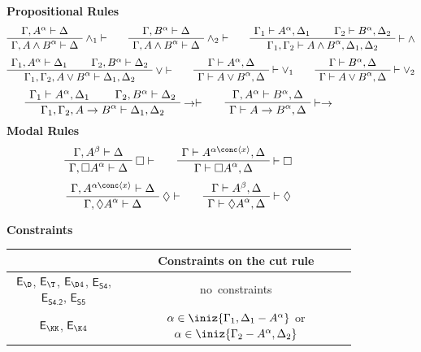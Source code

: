 \documentclass{article}
\newcommand{\seq}[2]{{#1} \vdash{} {#2}}
\newcommand{\pf}[2]{{#1}^{#2}} %
\theoremstyle{definition}
\begin{document}
{\begin{figure}
\textbf{Propositional Rules}
\[
\AxiomC{$\seq{\Gamma, \pf{A}{\alpha}}{\Delta}$}
\RightLabel{$\wedge_1 \vdash$}
\UnaryInfC{$\seq{\Gamma, \pf{A \wedge B}{\alpha}}{\Delta}$}
\DisplayProof
\qquad
\AxiomC{$\seq{\Gamma, \pf{B}{\alpha}}{\Delta}$}
\RightLabel{$\wedge_2 \vdash$}
\UnaryInfC{$\seq{\Gamma, \pf{A \wedge B}{\alpha}}{\Delta}$}
\DisplayProof
\qquad
\AxiomC{$\seq{\Gamma_1}{\pf{A}{\alpha}, \Delta_1}$}
\AxiomC{$\seq{\Gamma_2}{\pf{B}{\alpha}, \Delta_2}$}
\RightLabel{$\vdash \wedge$}
\BinaryInfC{$\seq{\Gamma_1, \Gamma_2}{\pf{A \wedge B}{\alpha}, \Delta_1, \Delta_2}$}
\DisplayProof
\]
\[
\AxiomC{$\seq{\Gamma_1, \pf{A}{\alpha}}{\Delta_1}$}
\AxiomC{$\seq{\Gamma_2, \pf{B}{\alpha}}{\Delta_2}$}
\RightLabel{$\vee \vdash$}
\BinaryInfC{$\seq{\Gamma_1, \Gamma_2, \pf{A \vee B}{\alpha}}{\Delta_1, \Delta_2}$}
\DisplayProof
\qquad
\AxiomC{$\seq{\Gamma}{\pf{A}{\alpha}, \Delta}$}
\RightLabel{$\vdash \vee_1$}
\UnaryInfC{$\seq{\Gamma}{\pf{A \vee B}{\alpha}, \Delta}$}
\DisplayProof
\qquad
\AxiomC{$\seq{\Gamma}{\pf{B}{\alpha}, \Delta}$}
\RightLabel{$\vdash \vee_2$}
\UnaryInfC{$\seq{\Gamma}{\pf{A \vee B}{\alpha}, \Delta}$}
\DisplayProof
\]
\[
\AxiomC{$\seq{\Gamma_1}{\pf{A}{\alpha}, \Delta_1}$}
\AxiomC{$\seq{\Gamma_2, \pf{B}{\alpha}}{\Delta_2}$}
\RightLabel{$\rightarrow \vdash$}
\BinaryInfC{$\seq{\Gamma_1, \Gamma_2, \pf{A \rightarrow B}{\alpha}}{\Delta_1, \Delta_2}$}
\DisplayProof
\qquad
\AxiomC{$\seq{\Gamma, \pf{A}{\alpha}}{\pf{B}{\alpha}, \Delta}$}
\RightLabel{$\vdash \rightarrow$}
\UnaryInfC{$\seq{\Gamma}{\pf{A \rightarrow B}{\alpha}, \Delta}$}
\DisplayProof
\]
\textbf{Modal Rules}
\[
\AxiomC{$\seq{\Gamma, \pf{A}{\beta}}{\Delta}$}
\RightLabel{$\Box \vdash$}
\UnaryInfC{$\seq{\Gamma, \pf{\Box A}{\alpha}}{\Delta}$}
\DisplayProof
\qquad
\AxiomC{$\seq{\Gamma}{\pf{A}{\alpha \conc \langle x \rangle}, \Delta}$}
\RightLabel{$\vdash \Box$}
\UnaryInfC{$\seq{\Gamma}{\pf{\Box A}{\alpha}, \Delta}$}
\DisplayProof
\]
\[
\AxiomC{$\seq{\Gamma, \pf{A}{\alpha \conc \langle x \rangle}}{\Delta}$}
\RightLabel{$\Diamond \vdash$}
\UnaryInfC{$\seq{\Gamma, \pf{\Diamond A}{\alpha}}{\Delta}$}
\DisplayProof
\qquad
\AxiomC{$\seq{\Gamma}{\pf{A}{\beta}, \Delta}$}
\RightLabel{$\vdash \Diamond$}
\UnaryInfC{$\seq{\Gamma}{\pf{\Diamond A}{\alpha}, \Delta}$}
\DisplayProof
\]


\textbf{Constraints} 

\center
\begin{tabular}{c|c}
        & \textbf{Constraints on  the cut rule  }\\
\hline
$\mathsf{E}_{{\D}}$, $\mathsf{E}_{{\T}}$, $\mathsf{E}_{{\D4}}$, $\mathsf{E}_{{\textsf{S4}}}$, $\mathsf{E}_{{\textsf{S4.2}}}$, $\mathsf{E}_{{\textsf{S5}}}$  & \mbox{\ no constraints\ }
\\
\hline
$\mathsf{E}_{{\KK}}$, $\mathsf{E}_{{\K4}}$ & {$\alpha \in \iniz{\Gamma_1,\Delta_1-\pf{A}{\alpha}}$ or  $\alpha \in \iniz{\Gamma_2-\pf{A}{\alpha},\Delta_2}$}     \\      
\end{tabular} 


\end{figure}}
\end{document}
